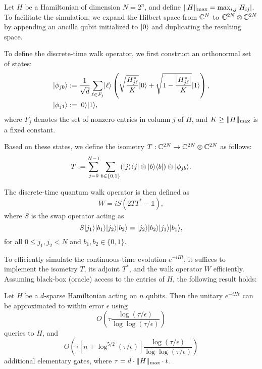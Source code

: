 \documentclass[11pt]{article}
\theoremstyle{definition}
\begin{document}
Let \( H \) be a Hamiltonian of dimension \( N = 2^n \), and define \( \lVert H\rVert_{\mathrm{max}} = \max_{i, j} \lvert H_{ij}\rvert \). To facilitate the simulation, we expand the Hilbert space from \( \mathbb{C}^N \) to \( \mathbb{C}^{2N} \otimes \mathbb{C}^{2N} \) by appending an ancilla qubit initialized to \( \lvert0\rangle \) and duplicating the resulting space.

To define the discrete-time walk operator, we first construct an orthonormal set of states:
\begin{align}
    \lvert\phi_{j0}\rangle & := \frac{1}{\sqrt{d}} \sum_{\ell \in F_j} \lvert\ell\rangle \left( \sqrt{\frac{H_{j\ell}^*}{K}} \lvert0\rangle + \sqrt{1 - \frac{\lvert H_{j\ell}^*\rvert}{K}} \lvert1\rangle \right), \label{eq:walk-sim} \\
    \lvert\phi_{j1}\rangle & := \lvert0\rangle \lvert1\rangle, \nonumber
\end{align}
where \( F_j \) denotes the set of nonzero entries in column \( j \) of \( H \), and \( K \ge \lVert H\rVert_{\mathrm{max}} \) is a fixed constant.

Based on these states, we define the isometry \( T : \mathbb{C}^{2N} \to \mathbb{C}^{2N} \otimes \mathbb{C}^{2N} \) as follows:
\begin{equation}
    \label{eq:walk-isom}
    T := \sum_{j = 0}^{N - 1} \sum_{b \in \{0, 1\}} (\lvert j\rangle\langle j\rvert \otimes \lvert b\rangle\langle b\rvert) \otimes \lvert\phi_{jb}\rangle.
\end{equation}

The discrete-time quantum walk operator is then defined as
\[
W = iS(2TT^* - \mathds{1}),
\]
where \( S \) is the swap operator acting as
\[
S \lvert j_1\rangle \lvert b_1\rangle \lvert j_2\rangle \lvert b_2\rangle = \lvert j_2\rangle \lvert b_2\rangle \lvert j_1\rangle \lvert b_1\rangle,
\]
for all \( 0 \le j_1, j_2 < N \) and \( b_1, b_2 \in \{0, 1\} \).

To efficiently simulate the continuous-time evolution \( e^{-iHt} \), it suffices to implement the isometry \( T \), its adjoint \( T^* \), and the walk operator \( W \) efficiently. Assuming black-box (oracle) access to the entries of \( H \), the following result holds:

\begin{theorem}
\label{thm:sparse-sim}
Let \( H \) be a \( d \)-sparse Hamiltonian acting on \( n \) qubits. Then the unitary \( e^{-iHt} \) can be approximated to within error \( \epsilon \) using
\[
O\left( \tau \frac{\log(\tau / \epsilon)}{\log\log(\tau / \epsilon)} \right)
\]
queries to \( H \), and
\[
O\left( \tau \left[ n + \log^{5 / 2}(\tau / \epsilon) \right] \frac{\log(\tau / \epsilon)}{\log\log(\tau / \epsilon)} \right)
\]
additional elementary gates, where \( \tau = d \cdot \lVert H\rVert_{\mathrm{max}} \cdot t \).
\end{theorem}
\end{document}
